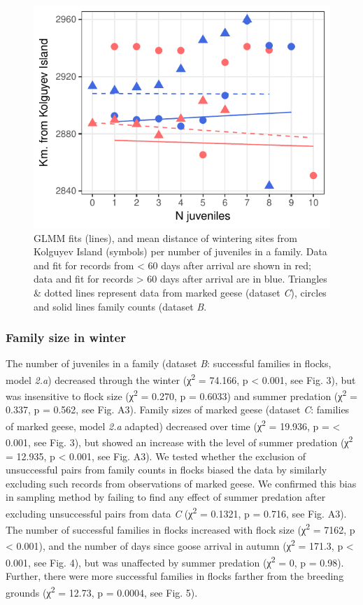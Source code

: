 \documentclass[10pt,twocolumn]{paper}
\begin{document}
\begin{figure}
\includegraphics[width = 1\linewidth]{dist_fam.pdf}
\caption{{\small GLMM fits (lines), and mean distance of wintering sites from Kolguyev Island (symbols) per number of juveniles in a family. Data and fit for
records from \textless{} 60 days after arrival are shown in red; data and fit for records \textgreater{} 60 days after arrival are in blue.
Triangles \& dotted lines represent data from marked geese (dataset \emph{C}), circles and solid lines family counts (dataset \emph{B}.}}
\end{figure}

\subsubsection{Family size in winter}\label{family-size-in-winter}

The number of juveniles in a family (dataset \emph{B}: successful
families in flocks, model \emph{2.a}) decreased through the winter
(χ\textsuperscript{2} = 74.166, p \textless{} 0.001, see Fig. 3), but
was insensitive to flock size (χ\textsuperscript{2} = 0.270, p = 0.6033)
and summer predation (χ\textsuperscript{2} = 0.337, p = 0.562, see Fig.
A3). Family sizes of marked geese (dataset \emph{C}: families of marked
geese, model \emph{2.a} adapted) decreased over time
(χ\textsuperscript{2} = 19.936, p = \textless{} 0.001, see Fig. 3), but
showed an increase with the level of summer predation
(χ\textsuperscript{2} = 12.935, p \textless{} 0.001, see Fig. A3). We
tested whether the exclusion of unsuccessful pairs from family counts in
flocks biased the data by similarly excluding such records from
observations of marked geese. We confirmed this bias in sampling method
by failing to find any effect of summer predation after excluding
unsuccessful pairs from data \emph{C} (χ\textsuperscript{2} = 0.1321, p
= 0.716, see Fig. A3). The number of successful families in flocks
increased with flock size (χ\textsuperscript{2} = 7162, p \textless{}
0.001), and the number of days since goose arrival in autumn
(χ\textsuperscript{2} = 171.3, p \textless{} 0.001, see Fig. 4), but was
unaffected by summer predation (χ\textsuperscript{2} = 0, p = 0.98).
Further, there were more successful families in flocks farther from the
breeding grounds (χ\textsuperscript{2} = 12.73, p = 0.0004, see Fig. 5).
\end{document}
